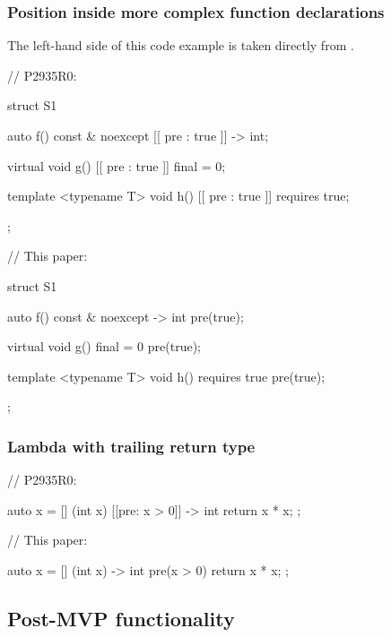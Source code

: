 \subsubsection{Position inside more complex function declarations}

The left-hand side of this code example is taken directly from \cite{P2935R0}.
\\

\begin{minipage}{8cm}
\begin{codeblock}
// P2935R0:

struct S1 {
  auto f() const & noexcept
    [[ pre : true ]] -> int;
    
  virtual void g()
    [[ pre : true ]] final = 0;
    
  template <typename T>
  void h()
    [[ pre : true ]] requires true;
};
\end{codeblock}
\end{minipage}
\begin{minipage}{8cm}
\begin{codeblock}
// This paper:

struct S1 {
  auto f() const & noexcept -> int
    pre(true);
    
  virtual void g() final = 0
    pre(true);
    
  template <typename T>
  void h() requires true
    pre(true);
};
\end{codeblock}
\end{minipage}


\subsubsection{Lambda with trailing return type}

\begin{minipage}{8cm}
\begin{codeblock}
// P2935R0:

auto x = [] (int x)
  [[pre: x > 0]] -> int
{ 
  return x * x; 
};
\end{codeblock}
\end{minipage}
\begin{minipage}{8cm}
\begin{codeblock}
// This paper:

auto x = [] (int x) -> int 
  pre(x > 0)
{ 
  return x * x; 
};
\end{codeblock}
\end{minipage}

\subsection{Post-MVP functionality}

